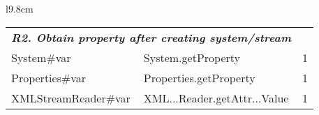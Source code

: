 \begin{wraptable}{l}{9.8cm}
\begin{tabular}{lll}
    \multicolumn{2}{l}{{\bf {\em R2. Obtain property after creating system/stream}}} & \\
    System\#var & System.getProperty &  1\\
    Properties\#var & Properties.getProperty &  1\\
    XMLStreamReader\#var & XML...Reader.getAttr...Value &  1\\
    \midrule

\end{tabular}
\end{wraptable}
